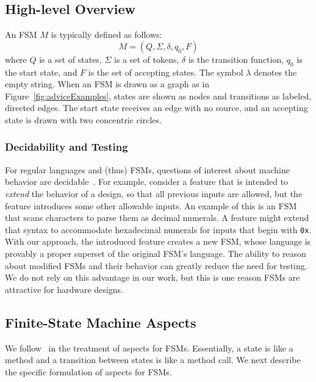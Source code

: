 \documentclass[conference]{IEEEtran}
\begin{document}
\subsection{High-level Overview}
An FSM $M$ is typically defined as follows: 
\[M = (Q, \Sigma, \delta, q_0, F)\]where $Q$ is a set of states, $\Sigma$ is a set of tokens, $\delta$ is the transition function, $q_0$ is the start state, and $F$ is the set of accepting states. The symbol $\lambda$ denotes the empty string.  When an FSM is drawn as a graph as in Figure~\ref{fig:adviceExamples}, states are shown as nodes and transitions as labeled, directed edges. The start state receives an edge with no source, and an accepting state is drawn with two concentric circles. 

\subsubsection{Decidability and Testing}
For regular languages and (thus) FSMs, questions of interest about machine behavior are decidable~\cite{sipser}. For example, consider a feature that is intended to \emph{extend} the behavior of a design, so that all previous inputs are allowed, but the feature introduces some other allowable inputs.
An example of this is an FSM that scans characters to parse them as decimal numerals.  A feature might extend that syntax to accommodate hexadecimal numerals for inputs that begin with \texttt{0x}. With our approach, the introduced feature creates a new FSM, whose language is provably a proper superset of the original FSM's language.  
The ability to reason about modified FSMs and their behavior can greatly reduce the need for testing.  We do not rely on this advantage in our work, but this is one reason FSMs are attractive for hardware designs.


\subsection{Finite-State Machine Aspects}
We follow~\cite{aspectsUML} in the treatment of aspects for FSMs. Essentially, a state is like a method and a transition between states is like a method call.  We next describe the specific formulation of aspects for FSMs.  
\end{document}
